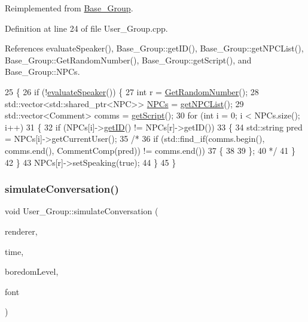 Reimplemented from \hyperlink{class_base___group_ae35b3719076cf40d6577b4ae3779758c}{Base\+\_\+\+Group}.



Definition at line 24 of file User\+\_\+\+Group.\+cpp.



References evaluate\+Speaker(), Base\+\_\+\+Group\+::get\+I\+D(), Base\+\_\+\+Group\+::get\+N\+P\+C\+List(), Base\+\_\+\+Group\+::\+Get\+Random\+Number(), Base\+\_\+\+Group\+::get\+Script(), and Base\+\_\+\+Group\+::\+N\+P\+Cs.


\begin{DoxyCode}
25 \{
26     \textcolor{keywordflow}{if} (!\hyperlink{class_user___group_a40051b822a0f0dd126b95d0f0fd28eff}{evaluateSpeaker}()) \{
27         \textcolor{keywordtype}{int} r = \hyperlink{class_base___group_a3864a2806457151363344051f2814389}{GetRandomNumber}();
28         std::vector<std::shared\_ptr<NPC>> \hyperlink{class_base___group_a4757f3c06c73eea029f71b871c1d863e}{NPCs} = \hyperlink{class_base___group_a75eec9132aaf532b4429e0af76b31775}{getNPCList}();
29         std::vector<Comment> comms = \hyperlink{class_base___group_a48dadfbc8cdefca9bdd2c42b99115ad8}{getScript}();
30         \textcolor{keywordflow}{for} (\textcolor{keywordtype}{int} i = 0; i < NPCs.size(); i++)
31         \{
32             \textcolor{keywordflow}{if} (NPCs[i]->\hyperlink{class_base___group_a7299ae154b26d741ac2f6f794bc3a544}{getID}() != NPCs[r]->getID())
33             \{
34                 std::string pred = NPCs[i]->getCurrentUser();
35                 \textcolor{comment}{/*}
36 \textcolor{comment}{                if (std::find\_if(comms.begin(), comms.end(), CommentComp(pred)) != comms.end())}
37 \textcolor{comment}{                \{}
38 \textcolor{comment}{}
39 \textcolor{comment}{                \};}
40 \textcolor{comment}{                */}
41             \}
42         \}
43         NPCs[r]->setSpeaking(\textcolor{keyword}{true});
44     \}
45 \}
\end{DoxyCode}
\mbox{\label{class_user___group_a0142ca8121ea4bb4d881153e48e486f9}} 
\subsubsection{\texorpdfstring{simulate\+Conversation()}{simulateConversation()}}
{\footnotesize\ttfamily void User\+\_\+\+Group\+::simulate\+Conversation (\begin{DoxyParamCaption}\item[{S\+D\+L\+\_\+\+Renderer $\ast$}]{renderer,  }\item[{bool}]{time,  }\item[{std\+::string}]{boredom\+Level,  }\item[{T\+T\+F\+\_\+\+Font $\ast$}]{font }\end{DoxyParamCaption})\hspace{0.3cm}{\ttfamily [virtual]}}



